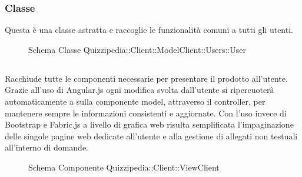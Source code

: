 \subsubsection{Classe }
Questa è una classe astratta e raccoglie le funzionalità comuni a tutti gli utenti.
\begin{figure}[H]
\centering
\noindent{}
\caption[Schema Classe User]{Schema Classe Quizzipedia::Client::ModelClient::Users::User}
\end{figure}
\subsection{}
Racchiude tutte le componenti necessarie per presentare il prodotto all'utente.
Grazie all'uso di Angular.js ogni modifica svolta dall'utente si ripercuoterà automaticamente a sulla componente model, attraverso il controller, per mantenere sempre le informazioni consistenti e aggiornate.
Con l'uso invece di Bootstrap e Fabric.js a livello di grafica web risulta semplificata l'impaginazione delle singole pagine web dedicate all'utente e alla gestione di allegati non testuali all'interno di domande.
\begin{figure}[H]
\centering
\noindent{}
\caption[Schema Componente Quizzipedia::Client::ViewClient]{Schema Componente Quizzipedia::Client::ViewClient}
\end{figure}

